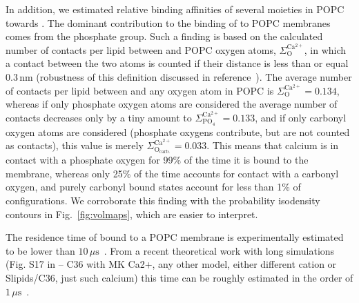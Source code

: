 \documentclass[aip,jcp,twocolumn]{revtex4}
\begin{document}
In addition, we estimated relative binding affinities 
of several moieties in POPC towards . 
The dominant contribution
to the binding of  to POPC membranes comes from the phosphate group. 
Such a finding is based on the calculated
number of contacts per lipid between  and POPC oxygen atoms, 
$\Sigma ^\mathrm{Ca^{2+}} _\mathrm{O}$,
in which a contact between the two atoms is counted 
if their distance is less than or equal $0.3 \, \mathrm{nm}$ 
(robustness of this definition discussed in reference~). 
The average number of contacts per lipid between  and any oxygen atom in POPC is 
$\Sigma ^\mathrm{Ca^{2+}} _\mathrm{O} = 0.134 $,    %
whereas if only phosphate oxygen atoms are considered 
the average number of contacts decreases only by a tiny amount to 
$\Sigma ^\mathrm{Ca^{2+}} _\mathrm{PO_4} = 0.133 $,    %
and if only carbonyl oxygen atoms are considered 
(phosphate oxygens contribute, but are not counted as contacts),
this value is merely
$\Sigma ^\mathrm{Ca^{2+}} _\mathrm{O_{carb.}} = 0.033 $.    %
This means that calcium is in contact with a phosphate oxygen for 99\% of the time it is bound to the membrane, 
whereas only 25\% of the time accounts for contact with a carbonyl oxygen,
and purely carbonyl bound states account for less than 1\% of configurations. 
We corroborate this finding with the probability isodensity contours in Fig.~\ref{fig:volmaps}, 
which are easier to interpret.

The residence time of  bound to a POPC membrane 
is experimentally estimated to be lower than $10\,\mu\mathrm{s}$~\cite{altenbach84}. 
From a recent theoretical work with long simulations 
(Fig. S17 in  -- C36 with MK Ca2+, any other model, either different cation or Slipids/C36, just such calcium)
this time can be roughly estimated %
in the order of $1\,\mu\mathrm{s}$~\cite{javanainen17}. 
\end{document}
